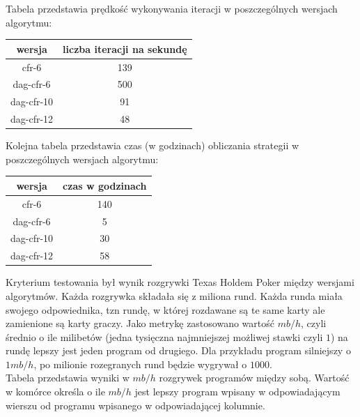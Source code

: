 \documentclass[magisterska]{pracamgr}
\begin{document}
\noindent
Tabela przedstawia prędkość wykonywania iteracji w poszczególnych wersjach algorytmu:

\begin{table}[h]
\begin{tabular}{|c|c|}
\hline
wersja     & liczba iteracji na sekundę \\ \hline
cfr-6      & 139                        \\ \hline
dag-cfr-6  & 500                        \\ \hline
dag-cfr-10 & 91                         \\ \hline
dag-cfr-12 & 48                         \\ \hline
\end{tabular}
\end{table}

\noindent
Kolejna tabela przedstawia czas (w godzinach) obliczania strategii w poszczególnych wersjach algorytmu:

\begin{table}[h]
\begin{tabular}{|c|c|}
\hline
wersja     & czas w godzinach           \\ \hline
cfr-6      & 140                        \\ \hline
dag-cfr-6  & 5                          \\ \hline
dag-cfr-10 & 30                         \\ \hline
dag-cfr-12 & 58                         \\ \hline
\end{tabular}
\end{table}

\noindent
Kryterium testowania był wynik rozgrywki Texas Holdem Poker między wersjami algorytmów.
Każda rozgrywka składała się z miliona rund. Każda runda miała swojego odpowiednika, tzn
rundę, w której rozdawane są te same karty ale zamienione są karty graczy. Jako metrykę
zastosowano wartość $mb/h$, czyli średnio o ile milibetów (jedna tysięczna najmniejszej możliwej stawki czyli $1$)
na rundę lepszy jest jeden program od drugiego. Dla przykładu program silniejszy o $1mb/h$, po milionie
rozegranych rund będzie wygrywał o $1000$. \\

\noindent
Tabela przedstawia wyniki w $mb/h$ rozgrywek programów między sobą. Wartość w komórce
określa o ile $mb/h$ jest lepszy program wpisany w odpowiadającym wierszu od programu wpisanego w odpowiadającej
kolumnie.
\end{document}
